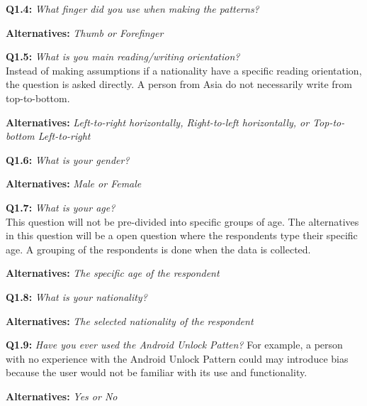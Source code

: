       {\bf Q1.4:} {\it What finger did you use when making the patterns?} \\
        \begin{enumerate*}
          \item[ ] {\bf Alternatives:} {\it Thumb or Forefinger}
        \end{enumerate*}

      {\bf Q1.5:} {\it What is you main reading/writing orientation?} \\
      Instead of making assumptions if a nationality have a specific reading orientation, the question is asked directly. A person from Asia do not necessarily write from top-to-bottom.
        \begin{enumerate*}
          \item[ ] {\bf Alternatives:} {\it Left-to-right horizontally, Right-to-left horizontally, or Top-to-bottom Left-to-right}
        \end{enumerate*}

      {\bf Q1.6:} {\it What is your gender?}
        \begin{enumerate*}
          \item[ ] {\bf Alternatives:} {\it Male or Female}
        \end{enumerate*}

      {\bf Q1.7:} {\it What is your age?} \\
      This question will not be pre-divided into specific groups of age. The alternatives in this question will be a open question where the respondents type their specific age. A grouping of the respondents is done when the data is collected.
        \begin{enumerate*}
          \item[ ] {\bf Alternatives:} {\it The specific age of the respondent}
        \end{enumerate*}

      {\bf Q1.8:} {\it What is your nationality?} \\
        \begin{enumerate*}
          \item[ ] {\bf Alternatives:} {\it The selected nationality of the respondent}
        \end{enumerate*}

      {\bf Q1.9:} {\it Have you ever used the Android Unlock Patten?}
      For example, a person with no experience with the Android Unlock Pattern could may introduce bias because the user would not be familiar with its use and functionality. 
        \begin{enumerate*}
          \item[ ] {\bf Alternatives:} {\it Yes or No}
        \end{enumerate*}

